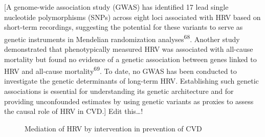 \documentclass[
  a4paper,
  headsepline=true,
  open=any]{scrbook}
\begin{document}
{[}A genome-wide association study (GWAS) has identified 17 lead single
nucleotide polymorphisms (SNPs) across eight loci associated with HRV
based on short-term recordings, suggesting the potential for these
variants to serve as genetic instruments in Mendelian randomization
analyses\textsuperscript{68}. Another study demonstrated that
phenotypically measured HRV was associated with all-cause mortality but
found no evidence of a genetic association between genes linked to HRV
and all-cause mortality\textsuperscript{69}. To date, no GWAS has been
conducted to investigate the genetic determinants of long-term HRV.
Establishing such genetic associations is essential for understanding
its genetic architecture and for providing unconfounded estimates by
using genetic variants as proxies to assess the causal role of HRV in
CVD.{]} Edit this\ldots!

\begin{figure}

\begin{minipage}[t]{\linewidth}

{\centering 


\caption{Mediation of HRV by intervention in prevention of CVD}

}

\end{minipage}%

\end{figure}
\end{document}
